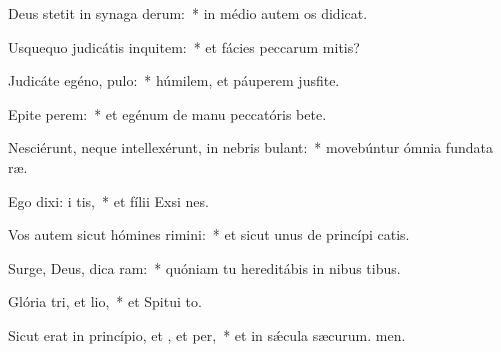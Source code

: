 \item Deus stetit in synaga derum:~* in médio autem os didicat.
\item Usquequo judicátis inquitem:~* et fácies peccarum mitis?
\item Judicáte egéno,  pulo:~* húmilem, et páuperem jusfite.
\item Epite perem:~* et egénum de manu peccatóris bete.
\item Nesciérunt, neque intellexérunt, in nebris bulant:~* movebúntur ómnia fundata ræ.
\item Ego dixi: i tis,~* et fílii Exsi nes.
\item Vos autem sicut hómines rimini:~* et sicut unus de princípi catis.
\item Surge, Deus, dica ram:~* quóniam tu hereditábis in nibus tibus.
\item Glória tri, et lio,~* et Spitui to.
\item Sicut erat in princípio, et , et per,~* et in sǽcula sæcurum. men.
